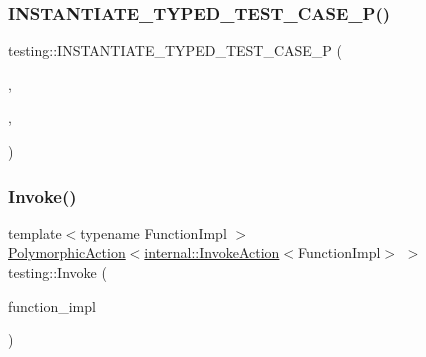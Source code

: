 \mbox{\label{namespacetesting_a111c1dea1140652727ab97ddc13eb045}} 
\subsubsection{\texorpdfstring{I\+N\+S\+T\+A\+N\+T\+I\+A\+T\+E\+\_\+\+T\+Y\+P\+E\+D\+\_\+\+T\+E\+S\+T\+\_\+\+C\+A\+S\+E\+\_\+\+P()}{INSTANTIATE\_TYPED\_TEST\_CASE\_P()}}
{\footnotesize\ttfamily testing\+::\+I\+N\+S\+T\+A\+N\+T\+I\+A\+T\+E\+\_\+\+T\+Y\+P\+E\+D\+\_\+\+T\+E\+S\+T\+\_\+\+C\+A\+S\+E\+\_\+P (\begin{DoxyParamCaption}\item[{My}]{,  }\item[{\hyperlink{classtesting_1_1_code_location_for_t_y_p_e_d_t_e_s_t_p}{Code\+Location\+For\+T\+Y\+P\+E\+D\+T\+E\+S\+TP}}]{,  }\item[{int}]{ }\end{DoxyParamCaption})}

\mbox{\label{namespacetesting_a12aebaf8363d49a383047529f798b694}} 
\subsubsection{\texorpdfstring{Invoke()}{Invoke()}\hspace{0.1cm}{\footnotesize\ttfamily [1/2]}}
{\footnotesize\ttfamily template$<$typename Function\+Impl $>$ \\
\hyperlink{classtesting_1_1_polymorphic_action}{Polymorphic\+Action}$<$\hyperlink{classtesting_1_1internal_1_1_invoke_action}{internal\+::\+Invoke\+Action}$<$Function\+Impl$>$ $>$ testing\+::\+Invoke (\begin{DoxyParamCaption}\item[{Function\+Impl}]{function\+\_\+impl }\end{DoxyParamCaption})}

\mbox{\label{namespacetesting_a80b82dc382445d240ff011f9c34aefc4}} 
